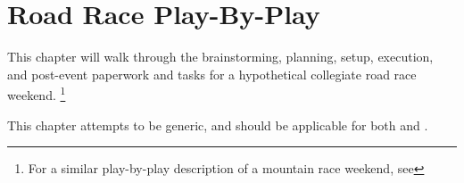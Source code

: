 \setchapterpreamble[u]{\margintoc}
\chapter{Road Race Play-By-Play}

This chapter will walk through the brainstorming,
planning, setup, execution, and post-event paperwork and tasks for a hypothetical collegiate road race weekend.%
\footnote{For a similar play-by-play description of a mountain race weekend,
see }

This chapter attempts to be generic, and should be applicable for both
 and
.




